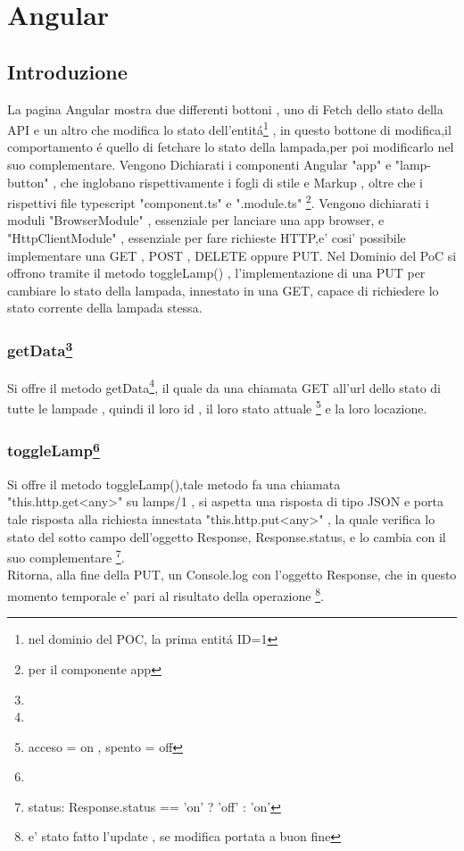 \chapter{Angular}\label{funzionamento}

\section{Introduzione}

La pagina Angular mostra due differenti bottoni , uno di Fetch dello stato della API e un altro che modifica lo stato dell'entitá\footnote{nel dominio del POC, la prima entitá ID=1} , in questo bottone di modifica,il comportamento é quello di fetchare lo stato della lampada,per poi modificarlo nel suo complementare.
Vengono Dichiarati i componenti Angular "app" e "lamp-button" , che inglobano rispettivamente i fogli di stile e Markup , oltre che i rispettivi file typescript "component.ts" e ".module.ts" \footnote{per il componente app}. 
Vengono dichiarati i moduli "BrowserModule" , essenziale per lanciare una app browser, e "HttpClientModule" , essenziale per fare richieste HTTP,e' cosi' possibile implementare una GET , POST , DELETE oppure PUT. 
Nel Dominio del PoC si offrono tramite il metodo toggleLamp() , l'implementazione di una PUT per cambiare lo stato della lampada, innestato in una GET, capace di richiedere lo stato corrente della lampada stessa.

\subsection{getData\footnote{}}

Si offre il metodo getData\footnote{}, il quale da una chiamata GET all'url dello stato di tutte le lampade , quindi il loro id , il loro stato attuale \footnote{acceso = on , spento = off} e la loro locazione.

\subsection{toggleLamp\footnote{}}

Si offre il metodo toggleLamp(),tale metodo fa una chiamata "this.http.get<any>" su lamps/1 , si aspetta una risposta di tipo JSON e porta tale risposta alla richiesta innestata "this.http.put<any>" , la quale verifica lo stato del sotto campo dell'oggetto Response, Response.status, e lo cambia con il suo complementare \footnote{status: Response.status == 'on' ? 'off' : 'on'}.\\
Ritorna, alla fine della PUT, un Console.log con l'oggetto Response, che in questo momento temporale e' pari al risultato della operazione \footnote{e' stato fatto l'update , se modifica portata a buon fine}.

